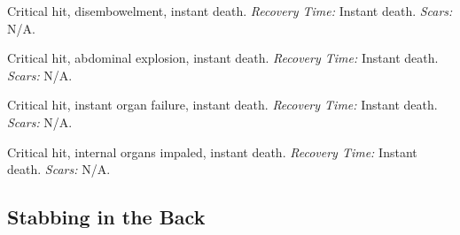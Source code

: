 \begin{description}[labelwidth=1.5em, leftmargin=*, itemsep=0.4em]
    \item[17 -] Critical hit, disembowelment, instant death. \textit{Recovery Time:} Instant death. \textit{Scars:} N/A.
    \item[18 -] Critical hit, abdominal explosion, instant death. \textit{Recovery Time:} Instant death. \textit{Scars:} N/A.
    \item[19 -] Critical hit, instant organ failure, instant death. \textit{Recovery Time:} Instant death. \textit{Scars:} N/A.
    \item[20 -] Critical hit, internal organs impaled, instant death. \textit{Recovery Time:} Instant death. \textit{Scars:} N/A.
\end{description}

\subsection{Stabbing in the Back}

